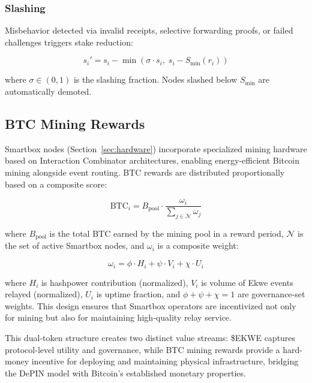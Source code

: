 \documentclass[11pt,a4paper]{article}
\begin{document}
\subsubsection{Slashing}

Misbehavior detected via invalid receipts, selective forwarding proofs, or failed challenges triggers stake reduction:

\begin{equation}
s_i' = s_i - \min\left(\sigma \cdot s_i, \; s_i - S_{\min}(r_i)\right)
\label{eq:slashing}
\end{equation}

where $\sigma \in (0, 1)$ is the slashing fraction. Nodes slashed below $S_{\min}$ are automatically demoted.

\subsection{BTC Mining Rewards}

Smartbox nodes (Section~\ref{sec:hardware}) incorporate specialized mining hardware based on Interaction Combinator architectures, enabling energy-efficient Bitcoin mining alongside event routing. BTC rewards are distributed proportionally based on a composite score:

\begin{equation}
\text{BTC}_i = B_{\text{pool}} \cdot \frac{\omega_i}{\sum_{j \in \mathcal{N}} \omega_j}
\label{eq:btc_reward}
\end{equation}

where $B_{\text{pool}}$ is the total BTC earned by the mining pool in a reward period, $\mathcal{N}$ is the set of active Smartbox nodes, and $\omega_i$ is a composite weight:

\begin{equation}
\omega_i = \phi \cdot H_i + \psi \cdot V_i + \chi \cdot U_i
\label{eq:btc_weight}
\end{equation}

where $H_i$ is hashpower contribution (normalized), $V_i$ is volume of Ekwe events relayed (normalized), $U_i$ is uptime fraction, and $\phi + \psi + \chi = 1$ are governance-set weights. This design ensures that Smartbox operators are incentivized not only for mining but also for maintaining high-quality relay service.

This dual-token structure creates two distinct value streams: \$EKWE captures protocol-level utility and governance, while BTC mining rewards provide a hard-money incentive for deploying and maintaining physical infrastructure, bridging the DePIN model with Bitcoin's established monetary properties.
\end{document}
